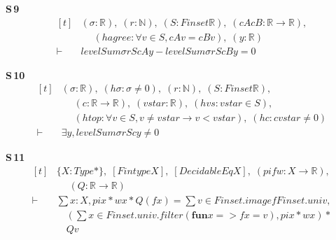 \noindent\textbf{S\,9}\quad{}
{\footnotesize\[ \begin{aligned}[t]
&(\sigma : \mathbb{R} ),\; (\mathit{r} : \mathbb{N} ),\; (\mathit{S} : \mathit{Finset} \mathbb{R} ),\; (\mathit{cA} \mathit{cB} : \mathbb{R} \to \mathbb{R} ),\\
&\quad \; (\mathit{hagree} : \forall \mathit{v} \in \mathit{S}, \mathit{cA} \mathit{v} = \mathit{cB} \mathit{v}),\; (\mathit{y} : \mathbb{R} )\\
\vdash\;&\mathit{levelSum} \sigma \mathit{r} \mathit{S} \mathit{cA} \mathit{y} - \mathit{levelSum} \sigma \mathit{r} \mathit{S} \mathit{cB} \mathit{y} = 0
\end{aligned} \]}

\noindent\textbf{S\,10}\quad{}
{\footnotesize\[ \begin{aligned}[t]
&(\sigma : \mathbb{R} ),\; (\mathit{hσ} : \sigma \neq 0),\; (\mathit{r} : \mathbb{N} ),\; (\mathit{S} : \mathit{Finset} \mathbb{R} ),\\
&\quad \; (\mathit{c} : \mathbb{R} \to \mathbb{R} ),\; (\mathit{vstar} : \mathbb{R} ),\; (\mathit{hvs} : \mathit{vstar} \in \mathit{S}),\\
&\quad \; (\mathit{htop} : \forall \mathit{v} \in \mathit{S}, \mathit{v} \neq \mathit{vstar} \to \mathit{v} < \mathit{vstar}),\; (\mathit{hc} : \mathit{c} \mathit{vstar} \neq 0)\\
\vdash\;&\exists \mathit{y}, \mathit{levelSum} \sigma \mathit{r} \mathit{S} \mathit{c} \mathit{y} \neq 0
\end{aligned} \]}

\noindent\textbf{S\,11}\quad{}
{\footnotesize\[ \begin{aligned}[t]
&\{ \mathit{X} : \mathit{Type}*\},\; [\mathit{Fintype} \mathit{X}],\; [\mathit{DecidableEq} \mathit{X}],\; (\mathit{pi} \mathit{f} \mathit{w} : \mathit{X} \to \mathbb{R} ),\\
&\quad \; (\mathit{Q} : \mathbb{R} \to \mathbb{R} )\\
\vdash\;&\textstyle\sum \mathit{x} : \mathit{X}, \mathit{pi} \mathit{x} * \mathit{w} \mathit{x} * \mathit{Q} (\mathit{f} \mathit{x}) = \textstyle\sum \mathit{v} \in \mathit{Finset}.\mathit{image} \mathit{f} \mathit{Finset}.\mathit{univ},\\
&\quad (\textstyle\sum \mathit{x} \in \mathit{Finset}.\mathit{univ}.\mathit{filter} (\mathbf{fun} \mathit{x} => \mathit{f} \mathit{x} = \mathit{v}), \mathit{pi} \mathit{x} * \mathit{w} \mathit{x}) *\\
&\quad \mathit{Q} \mathit{v}
\end{aligned} \]}


